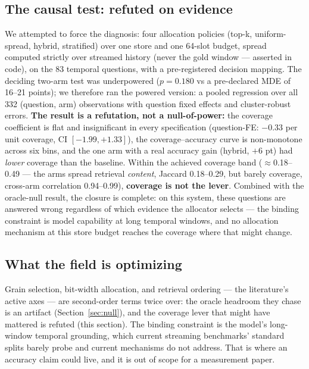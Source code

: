 \subsection{The causal test: refuted on evidence}
We attempted to force the diagnosis: four allocation policies (top-k, uniform-spread, hybrid, stratified) over one store and one 64-slot budget, spread computed strictly over streamed history (never the gold window — asserted in code), on the 83 temporal questions, with a pre-registered decision mapping. The deciding two-arm test was underpowered ($p{=}0.180$ vs a pre-declared MDE of 16--21 points); we therefore ran the powered version: a pooled regression over all 332 (question, arm) observations with question fixed effects and cluster-robust errors. \textbf{The result is a refutation, not a null-of-power:} the coverage coefficient is flat and insignificant in every specification (question-FE: $-0.33$ per unit coverage, CI $[-1.99, +1.33]$), the coverage--accuracy curve is non-monotone across six bins, and the one arm with a real accuracy gain (hybrid, $+6$ pt) had \emph{lower} coverage than the baseline. Within the achieved coverage band ($\approx$0.18--0.49 — the arms spread retrieval \emph{content}, Jaccard 0.18--0.29, but barely coverage, cross-arm correlation 0.94--0.99), \textbf{coverage is not the lever}. Combined with the oracle-null result, the closure is complete: on this system, these questions are answered wrong regardless of which evidence the allocator selects — the binding constraint is model capability at long temporal windows, and no allocation mechanism at this store budget reaches the coverage where that might change.

\subsection{What the field is optimizing}
Grain selection, bit-width allocation, and retrieval ordering — the literature's active axes — are second-order terms twice over: the oracle headroom they chase is an artifact (Section~\ref{sec:null}), and the coverage lever that might have mattered is refuted (this section). The binding constraint is the model's long-window temporal grounding, which current streaming benchmarks' standard splits barely probe and current mechanisms do not address. That is where an accuracy claim could live, and it is out of scope for a measurement paper.
